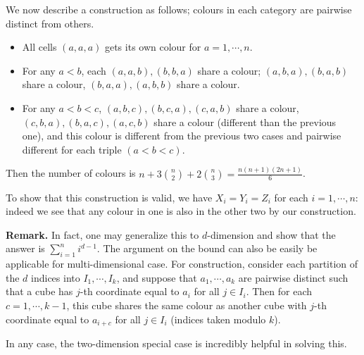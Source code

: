 \documentclass[11pt,a4paper]{article}
\begin{document}
\begin{enumerate}
    We now describe a construction as follows; colours in each category are pairwise distinct from others. 
    \begin{itemize}
    	\item All cells $(a, a, a)$ gets its own colour for $a=1, \cdots, n$. 
    	
    	\item For any $a< b$, each $(a, a, b), (b, b, a)$ share a colour; 
    	$(a, b, a), (b, a, b)$ share a colour, 
    	$(b, a, a), (a, b, b)$ share a colour. 
    	
    	\item For any $a<b<c$, $(a, b, c), (b, c, a), (c, a, b)$ share a colour,
    	$(c, b, a), (b, a, c), (a, c, b)$ share a colour (different than the previous one),
    	 and this colour is different from the previous two cases and pairwise different for each triple $(a<b<c)$. 
    \end{itemize}
    Then the number of colours is $n + 3\binom{n}{2} + 2\binom{n}{3}=\frac{n(n+1)(2n+1)}{6}$. 
    
    To show that this construction is valid, we have $X_i=Y_i=Z_i$ for each $i=1, \cdots, n$: 
    indeed we see that any colour in one is also in the other two by our construction. 
    
    \textbf{Remark.} 
    In fact, one may generalize this to $d$-dimension and show that the answer is $\sum_{i=1}^n i^{d-1}$. 
    The argument on the bound can also be easily be applicable for multi-dimensional case. 
    For construction, consider each partition of the $d$ indices into $I_1, \cdots, I_k$, 
    and suppose that $a_1, \cdots, a_k$ are pairwise distinct such that a cube has $j$-th coordinate equal to $a_i$ for all $j\in I_i$. 
    Then for each $c=1, \cdots, k-1$, 
    this cube shares the same colour as another cube with $j$-th coordinate equal to $a_{i+c}$ for all $j\in I_i$ 
    (indices taken modulo $k$). 
    
    In any case, the two-dimension special case is incredibly helpful in solving this. 
\end{enumerate}
\end{document}
